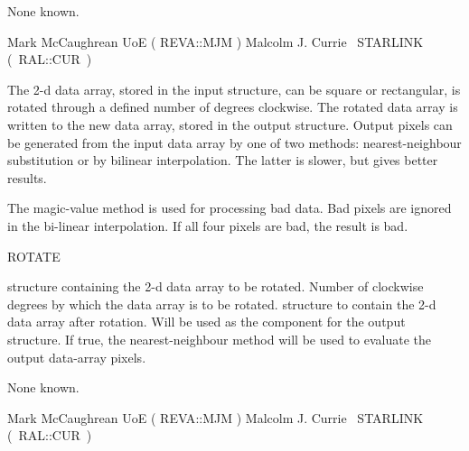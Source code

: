 {\begin{manroutinedescription}
  None known.

  Mark McCaughrean UoE ( {\mantt REVA}::{\mantt MJM} )
  Malcolm J. Currie ~STARLINK \mbox{( {\mantt RAL}::{\mantt CUR} )}
\end{manroutinedescription}

\begin{manroutinedescription}
  The 2-d data array, stored in the input {} structure, can be
  square or rectangular, is rotated through a defined number of
  degrees clockwise. The rotated data array is written to the new
  data array, stored in the output {} structure.  Output pixels
  can be generated from the input data array by one of
  two methods: nearest-neighbour substitution or by bilinear
  interpolation.  The latter is slower, but gives better results.

  The magic-value method is used for processing bad data.  Bad
  pixels are ignored in the bi-linear interpolation.  If all four
  pixels are bad, the result is bad.

  ROTATE

\begin{manparametertable}
  {} structure containing the 2-d data array to be rotated.
  Number of clockwise degrees by which the data array is to be
  rotated.
  {} structure to contain the 2-d data array after rotation.
  Will be used as the {} component for the output
  {} structure.  \mbox{{}}
  If true, the nearest-neighbour method will be used to
  evaluate the output data-array pixels. \mbox{{\mantt [TRUE]}}
\end{manparametertable}
  None known.

  Mark McCaughrean UoE ( {\mantt REVA}::{\mantt MJM} )
  Malcolm J. Currie ~STARLINK \mbox{( {\mantt RAL}::{\mantt CUR} )}
\end{manroutinedescription}

}

